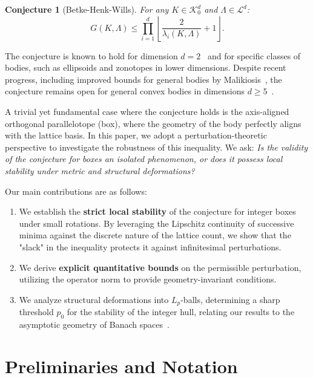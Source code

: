\documentclass[11pt, reqno]{amsart}
\newtheorem{conjecture}[theorem]{Conjecture}
\theoremstyle{definition}
\newcommand{\K}{\mathcal{K}}
\begin{document}
\begin{conjecture}[Betke-Henk-Wills] \label{conj:main}
For any $K \in \K^d_0$ and $\Lambda \in \mathcal{L}^d$:
\begin{equation}
G(K, \Lambda) \le \prod_{i=1}^d \left\lfloor \frac{2}{\lambda_i(K, \Lambda)} + 1 \right\rfloor.
\end{equation}
\end{conjecture}

The conjecture is known to hold for dimension $d=2$~\cite{betke1993successive} and for specific classes of bodies, such as ellipsoids and zonotopes in lower dimensions. Despite recent progress, including improved bounds for general bodies by Malikiosis~\cite{malikiosis2010optimization}, the conjecture remains open for general convex bodies in dimensions $d \ge 5$~\cite{henk2002successive}.

A trivial yet fundamental case where the conjecture holds is the axis-aligned orthogonal parallelotope (box), where the geometry of the body perfectly aligns with the lattice basis. In this paper, we adopt a perturbation-theoretic perspective to investigate the robustness of this inequality. We ask: \textit{Is the validity of the conjecture for boxes an isolated phenomenon, or does it possess local stability under metric and structural deformations?}

Our main contributions are as follows:
\begin{enumerate}
    \item We establish the \textbf{strict local stability} of the conjecture for integer boxes under small rotations. By leveraging the Lipschitz continuity of successive minima against the discrete nature of the lattice count, we show that the "slack" in the inequality protects it against infinitesimal perturbations.
    \item We derive \textbf{explicit quantitative bounds} on the permissible perturbation, utilizing the operator norm to provide geometry-invariant conditions.
    \item We analyze structural deformations into $L_p$-balls, determining a sharp threshold $p_0$ for the stability of the integer hull, relating our results to the asymptotic geometry of Banach spaces~\cite{banaszczyk1996inequalities}.
\end{enumerate}

\section{Preliminaries and Notation}
\end{document}
